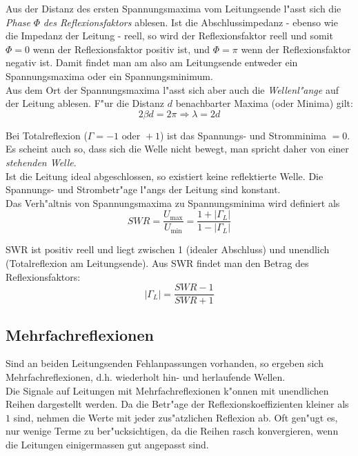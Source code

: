 \documentclass[german, 10pt, a4paper, headsepline]{scrreprt}
\theoremstyle{remark}
\begin{document}
Aus der Distanz des ersten Spannungsmaxima vom Leitungsende l"asst sich die \textit{Phase} $\Phi$ \textit{des Reflexionsfaktors} ablesen. Ist die Abschlussimpedanz - ebenso wie die Impedanz der Leitung - reell, so wird der Reflexionsfaktor reell und somit $\Phi = 0$ wenn der Reflexionsfaktor positiv ist, und $\Phi = \pi$ wenn der Reflexionsfaktor negativ ist. Damit findet man am also am Leitungsende entweder ein Spannungsmaxima oder ein Spannungsminimum.\\
Aus dem Ort der Spannungsmaxima l"asst sich aber auch die \textit{Wellenl"ange} auf der Leitung ablesen. F"ur die Distanz $d$ benachbarter Maxima (oder Minima) gilt:
\begin{displaymath}
	2\beta d = 2\pi \Rightarrow \lambda = 2d
\end{displaymath}

Bei Totalreflexion ($\Gamma = -1 \mbox{ oder } +1$) ist das Spannungs- und Stromminima $=0$. Es scheint auch so, dass sich die Welle nicht bewegt, man spricht daher von einer \textit{stehenden Welle}.\\

Ist die Leitung ideal abgeschlossen, so existiert keine reflektierte Welle. Die Spannungs- und Strombetr"age l"angs der Leitung sind konstant.\\

Das Verh"altnis von Spannungsmaxima zu Spannungsminima wird definiert als
\begin{displaymath}
	SWR = \frac{U_{\max}}{U_{\min}} = \frac{1+|\Gamma_L|}{1-|\Gamma_L|}
\end{displaymath}

SWR ist positiv reell und liegt zwischen 1 (idealer Abschluss) und unendlich (Totalreflexion am Leitungsende). Aus SWR findet man den Betrag des Reflexionsfaktors:
\begin{displaymath}
	|\Gamma_L| = \frac{SWR -1}{SWR +1}
\end{displaymath}

\subsection{Mehrfachreflexionen}

Sind an beiden Leitungsenden Fehlanpassungen vorhanden, so ergeben sich Mehrfachreflexionen, d.h. wiederholt hin- und herlaufende Wellen.\\
Die Signale auf Leitungen mit Mehrfachreflexionen k"onnen mit unendlichen Reihen dargestellt werden. Da die Betr"age der Reflexionskoeffizienten kleiner als $1$ sind, nehmen die Werte mit jeder zus"atzlichen Reflexion ab. Oft gen"ugt es, nur wenige Terme zu ber"ucksichtigen, da die Reihen rasch konvergieren, wenn die Leitungen einigermassen gut angepasst sind.
\end{document}
